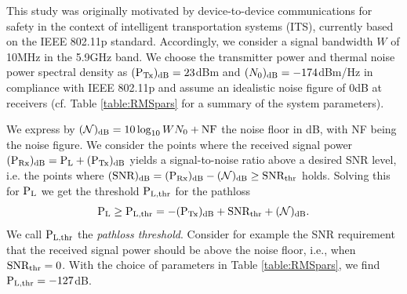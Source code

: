 \documentclass[10pt,a4paper]{article}
\begin{document}
This study was originally motivated by device-to-device communications for safety in the context of 
 intelligent transportation systems (ITS), currently based on the IEEE 802.11p standard. 
Accordingly, we consider a signal bandwidth $W$  of 10MHz in the 5.9GHz band. We choose the transmitter power and thermal noise power spectral density as $(\textup{P}_{\textup{Tx}})_{\rm dB} = 23$dBm and $(N_0)_{\rm dB} =-174$dBm/Hz in compliance with IEEE 802.11p and assume an idealistic noise figure of 0dB at receivers (cf. Table \ref{table:RMSpars} for a summary of the system parameters).

We express by $(\mathcal{N})_{\rm dB} =  10\log_{10} W N_0 + \textup{NF}$ the noise floor in dB, with NF being the noise figure.
We consider the points  where the received signal power $(\textup{P}_{\textup{Rx}})_{\rm dB} = \textup{P}_{\textup{L}}+ (\textup{P}_{\textup{Tx}})_{\rm dB}$  yields a signal-to-noise ratio above a desired SNR level, i.e. the points where $(\textup{SNR})_{\rm dB} = (\textup{P}_{\textup{Rx}})_{\rm dB} - (\mathcal{N})_{\rm dB} \geq \textup{SNR}_{\textup{thr}}$ holds.  Solving this for $\textup{P}_{\textup{L}}$ we get the threshold $\textup{P}_{\textup{L,thr}}$ for the pathloss
\begin{equation}\label{eq:thr}
    \textup{P}_{\textup{L}}\geq \textup{P}_{\textup{L,thr}} = -(\textup{P}_{\textup{Tx}})_{\rm dB} + \textup{SNR}_{\textup{thr}} + (\mathcal{N})_{\rm dB}.
\end{equation}
We call $\textup{P}_{\textup{L,thr}}$ the \emph{pathloss threshold}.
Consider for example the SNR requirement that the received signal power should be above the noise floor, i.e., when $\textup{SNR}_{\textup{thr}}=0$. With the choice of parameters in Table \ref{table:RMSpars}, we find $\textup{P}_{\textup{L,thr}} = -127$dB. 
\end{document}
